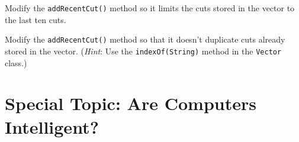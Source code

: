 \label{self-study-exercises}
\begin{SSTUDY}

\item  Modify the {\tt addRecentCut()} method so it limits the cuts stored
in the vector to the last ten cuts.


\item  Modify the {\tt addRecentCut()} method so that it doesn't duplicate
cuts already stored in the vector. ({\it Hint}: Use the 
{\tt indexOf(String)} method in the {\tt Vector} class.)

\end{SSTUDY}

\section*{{\color{cyan}Special Topic:} Are Computers Intelligent?}

